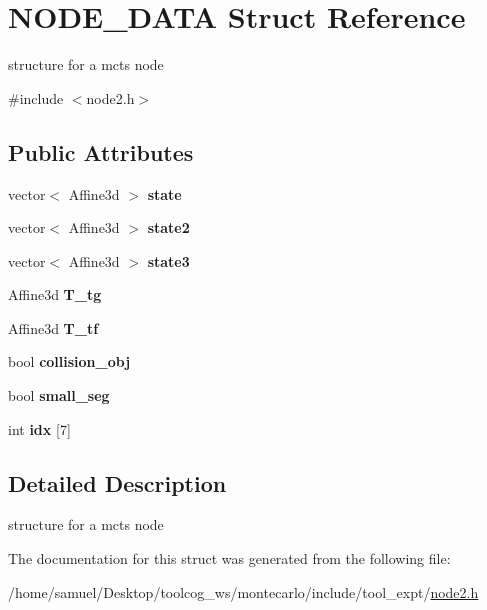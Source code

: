 \hypertarget{structNODE__DATA}{}\section{N\+O\+D\+E\+\_\+\+D\+A\+TA Struct Reference}
\label{structNODE__DATA}


structure for a mcts node  




{\ttfamily \#include $<$node2.\+h$>$}

\subsection*{Public Attributes}
\begin{DoxyCompactItemize}
\item 
\mbox{\label{structNODE__DATA_aae3d5d752b9ef351952cf749df3e85b5}} 
vector$<$ Affine3d $>$ {\bfseries state}
\item 
\mbox{\label{structNODE__DATA_a24304e103dd92eb6579ef003ff5b16ec}} 
vector$<$ Affine3d $>$ {\bfseries state2}
\item 
\mbox{\label{structNODE__DATA_aa52b5d8ed96d80457771a9b8da50364d}} 
vector$<$ Affine3d $>$ {\bfseries state3}
\item 
\mbox{\label{structNODE__DATA_a5e4f62e87190c8ef8e36239357af6f33}} 
Affine3d {\bfseries T\+\_\+tg}
\item 
\mbox{\label{structNODE__DATA_af12f27ddcc11a041e4235c01369871c3}} 
Affine3d {\bfseries T\+\_\+tf}
\item 
\mbox{\label{structNODE__DATA_a5965c65a748e406b4386e63e64287577}} 
bool {\bfseries collision\+\_\+obj}
\item 
\mbox{\label{structNODE__DATA_a66b30ca949e19f28675dd874efb6bc02}} 
bool {\bfseries small\+\_\+seg}
\item 
\mbox{\label{structNODE__DATA_a5221e0a78938bc0dc51ddf375ac3d5df}} 
int {\bfseries idx} \mbox{[}7\mbox{]}
\end{DoxyCompactItemize}


\subsection{Detailed Description}
structure for a mcts node 

The documentation for this struct was generated from the following file\+:\begin{DoxyCompactItemize}
\item 
/home/samuel/\+Desktop/toolcog\+\_\+ws/montecarlo/include/tool\+\_\+expt/\hyperlink{node2_8h}{node2.\+h}\end{DoxyCompactItemize}
